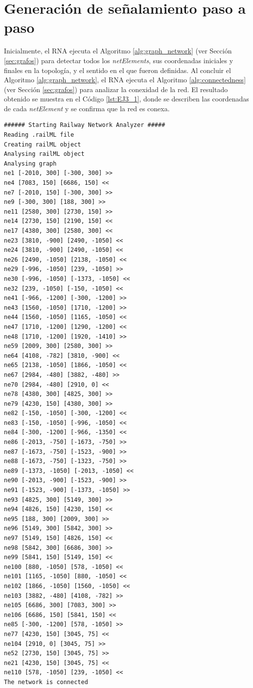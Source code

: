 \section{Generación de señalamiento paso a paso}
	
	Inicialmente, el RNA ejecuta el Algoritmo \ref{alg:graph_network} (ver Sección \ref{sec:grafos}) para detectar todos los \textit{netElements}, sus coordenadas iniciales y finales en la topología, y el sentido en el que fueron definidas. Al concluir el Algoritmo \ref{alg:graph_network}, el RNA ejecuta el Algoritmo \ref{alg:connectedness} (ver Sección \ref{sec:grafos}) para analizar la conexidad de la red. El resultado obtenido se muestra en el Código \ref{lst:EJ3_1}, donde se describen las coordenadas de cada \textit{netElement} y se confirma que la red es conexa.
	
	\begin{lstlisting}[language = {}, tabsize=4, basicstyle=\footnotesize\ttfamily, showspaces=false, showstringspaces=false, caption = Detección de \textit{netElements} por parte del RNA , label = {lst:EJ3_1}]
###### Starting Railway Network Analyzer #####
Reading .railML file
Creating railML object
Analysing railML object
Analysing graph
ne1 [-2010, 300] [-300, 300] >>   
ne4 [7083, 150] [6686, 150] <<    
ne7 [-2010, 150] [-300, 300] >>   
ne9 [-300, 300] [188, 300] >>     
ne11 [2580, 300] [2730, 150] >>   
ne14 [2730, 150] [2190, 150] <<   
ne17 [4380, 300] [2580, 300] <<   
ne23 [3810, -900] [2490, -1050] <<
ne24 [3810, -900] [2490, -1050] <<
ne26 [2490, -1050] [2138, -1050] <<
ne29 [-996, -1050] [239, -1050] >>
ne30 [-996, -1050] [-1373, -1050] <<
ne32 [239, -1050] [-150, -1050] <<
ne41 [-966, -1200] [-300, -1200] >>
ne43 [1560, -1050] [1710, -1200] >>
ne44 [1560, -1050] [1165, -1050] <<
ne47 [1710, -1200] [1290, -1200] <<
ne48 [1710, -1200] [1920, -1410] >>
ne59 [2009, 300] [2580, 300] >>
ne64 [4108, -782] [3810, -900] <<
ne65 [2138, -1050] [1866, -1050] <<
ne67 [2984, -480] [3882, -480] >>
ne70 [2984, -480] [2910, 0] <<
ne78 [4380, 300] [4825, 300] >>
ne79 [4230, 150] [4380, 300] >>
ne82 [-150, -1050] [-300, -1200] <<
ne83 [-150, -1050] [-996, -1050] <<
ne84 [-300, -1200] [-966, -1350] <<
ne86 [-2013, -750] [-1673, -750] >>
ne87 [-1673, -750] [-1523, -900] >>
ne88 [-1673, -750] [-1323, -750] >>
ne89 [-1373, -1050] [-2013, -1050] <<
ne90 [-2013, -900] [-1523, -900] >>
ne91 [-1523, -900] [-1373, -1050] >>
ne93 [4825, 300] [5149, 300] >>
ne94 [4826, 150] [4230, 150] <<
ne95 [188, 300] [2009, 300] >>
ne96 [5149, 300] [5842, 300] >>
ne97 [5149, 150] [4826, 150] <<
ne98 [5842, 300] [6686, 300] >>
ne99 [5841, 150] [5149, 150] <<
ne100 [880, -1050] [578, -1050] <<
ne101 [1165, -1050] [880, -1050] <<
ne102 [1866, -1050] [1560, -1050] <<
ne103 [3882, -480] [4108, -782] >>
ne105 [6686, 300] [7083, 300] >>
ne106 [6686, 150] [5841, 150] <<
ne85 [-300, -1200] [578, -1050] >>
ne77 [4230, 150] [3045, 75] <<
ne104 [2910, 0] [3045, 75] >>
ne52 [2730, 150] [3045, 75] >>
ne21 [4230, 150] [3045, 75] <<
ne110 [578, -1050] [239, -1050] <<
The network is connected
	\end{lstlisting}
	
